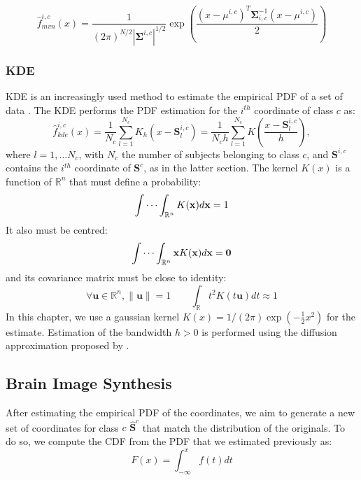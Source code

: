 \begin{equation}
\hat{f}_{mvn}^{i,c}(x) = \frac{1}{(2\pi)^{N/2}\left|\boldsymbol{\Sigma}^{i,c}\right|^{1/2}} \exp{ \left(\frac{(x-\mu^{i,c})^T \boldsymbol{\Sigma}_{i,c}^{-1}(x-\mu^{i,c})}{2}\right)}
\end{equation}

\subsubsection{\acf{KDE}}
\acf{KDE} is an increasingly used method to estimate the empirical \ac{PDF} of a set of data \cite{Botev2010,Simonoff2012}. The \ac{KDE} performs the \ac{PDF} estimation for the $i^{th}$ coordinate of class $c$ as: 
\begin{equation}
\hat{f}_{kde}^{i,c}(x) = \frac{1}{N_c}\sum_{l=1}^{N_c} K_h \left(x - \mathbf{S}^{i,c}_l\right) = \frac{1}{N_c h} \sum_{l=1}^{N_c} K\left(\frac{x-\mathbf{S}^{i,c}_l}{h}\right),
\end{equation}
where $l=1,\dots N_c$, with $N_c$ the number of subjects belonging to class $c$, and $\mathbf{S}^{i,c}$ contains the $i^{th}$ coordinate of $\mathbf{S}^{c}$, as in the latter section. The kernel $K(x)$ is a function of $\mathbb{R}^n$ that must define a probability: 
\begin{equation}
\idotsint_{\mathbb{R}^n} K(\mathbf{x}) d\mathbf{x} = 1
\end{equation}
It also must be centred:
\begin{equation}
\idotsint_{\mathbb{R}^n} \mathbf{x}K(\mathbf{x}) d\mathbf{x} =
\mathbf{0}
\end{equation}
and its covariance matrix must be close to identity:
\begin{equation}
\forall \mathbf{u}\in\mathbb{R}^n, \|\mathbf{u}\| = 1\qquad\int_{\mathbb{R}} t^2K(t \mathbf{u}) dt \approx	1
\end{equation}
In this chapter, we use a gaussian kernel $K(x)=1/(2\pi)\exp(-\frac{1}{2}x^2)$ for the estimate. Estimation of the bandwidth $h>0$ is performed using the diffusion approximation proposed by \cite{Botev2010}.

\subsection{Brain Image Synthesis}
After estimating the empirical \ac{PDF} of the coordinates, we aim to generate a new set of coordinates for class $c$ $\widehat{\mathbf{S}}^c$ that match the distribution of the originals. To do so, we compute the \ac{CDF} from the \ac{PDF} that we estimated previously as:
\begin{equation}
F(x) = \int_{-\infty}^{x} f(t)dt
\end{equation}

